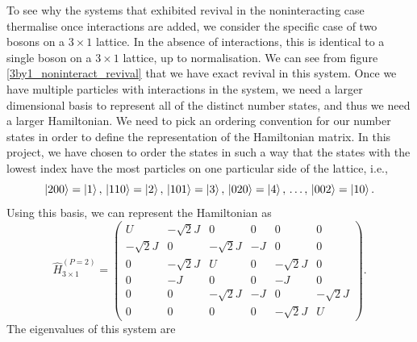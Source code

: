 \documentclass[a4paper, 10pt]{article}
\theoremstyle{plain}
\begin{document}
To see why the systems that exhibited revival in the noninteracting case
thermalise once interactions are added, we consider the specific case of
two bosons on a $3\times1$ lattice. In the absence of interactions, this
is identical to a single boson on a $3\times1$ lattice, up to normalisation.
We can see from figure \ref{3by1_noninteract_revival} that we have exact revival
in this system. Once we have multiple particles with interactions in the system,
we need a larger dimensional basis to represent all of the distinct number
states, and thus we need a larger Hamiltonian. We need to pick an ordering
convention for our number states in order to define the representation of
the Hamiltonian matrix. In this project, we have chosen to order the states
in such a way that the states with the lowest index have the most particles on
one particular side of the lattice, i.e.,
\begin{equation*}
    \ket{200} = \ket{1},\,
    \ket{110} = \ket{2},\,
    \ket{101} = \ket{3},\,
    \ket{020} = \ket{4},\,
    \dots,\,
    \ket{002} = \ket{10}.
\end{equation*}
Using this basis, we can represent the Hamiltonian as
\begin{equation}
    \hat{H}_{3\times1}^{\left(P=2\right)}
    =
    \begin{pmatrix}
             U & -\sqrt{2}J &          0 &   0 &          0 &          0 \\
    -\sqrt{2}J &          0 & -\sqrt{2}J &  -J &          0 &          0 \\
             0 & -\sqrt{2}J &          U &   0 & -\sqrt{2}J &          0 \\
             0 &         -J &          0 &   0 &         -J &          0 \\
             0 &          0 & -\sqrt{2}J &  -J &          0 & -\sqrt{2}J \\
             0 &          0 &          0 &   0 & -\sqrt{2}J &          U
    \end{pmatrix}.
\end{equation}
The eigenvalues of this system are
\end{document}
